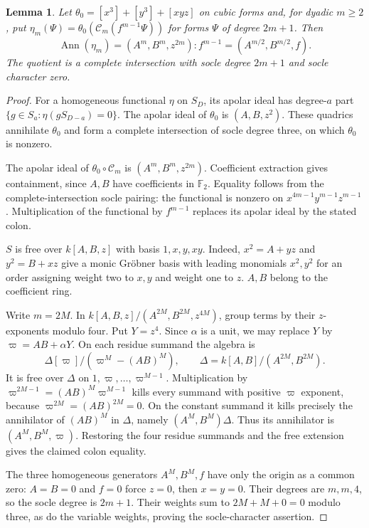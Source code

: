 \documentclass[11pt,a4paper,reqno]{amsart}
\numberwithin{equation}{section}
\theoremstyle{plain}
\newtheorem{lemma}[theorem]{Lemma}
\theoremstyle{definition}
\theoremstyle{remark}
\DeclareMathOperator{\Ann}{Ann}
\begin{document}
\begin{lemma}
Let $\theta_0=[x^3]+[y^3]+[xyz]$ on cubic forms and, for dyadic $m\geq2$, put
$\eta_m(\Psi)=\theta_0(\mathcal C_m(f^{m-1}\Psi))$ for forms $\Psi$ of degree $2m+1$. Then
\[
\Ann(\eta_m)=(A^m,B^m,z^{2m}):f^{m-1}
=(A^{m/2},B^{m/2},f).
\]
The quotient is a complete intersection with socle degree $2m+1$ and socle character zero.
\end{lemma}
\begin{proof}
For a homogeneous functional $\eta$ on $S_D$, its apolar ideal has
degree-$a$ part
$\{g\in S_a:\eta(gS_{D-a})=0\}$.
The apolar ideal of $\theta_0$ is $(A,B,z^2)$.
These quadrics annihilate $\theta_0$ and form a complete intersection
of socle degree three, on which $\theta_0$ is nonzero.

The apolar ideal of $\theta_0\circ\mathcal C_m$ is
$(A^m,B^m,z^{2m})$. Coefficient extraction gives containment, since
$A,B$ have coefficients in $\mathbb F_2$.
Equality follows from the complete-intersection socle pairing:
the functional is nonzero on $x^{4m-1}y^{m-1}z^{m-1}$.
Multiplication of the functional by $f^{m-1}$ replaces its apolar
ideal by the stated colon.

$S$ is free over $k[A,B,z]$ with basis $1,x,y,xy$.
Indeed, $x^2=A+yz$ and $y^2=B+xz$ give a monic Gr\"obner basis
with leading monomials $x^2,y^2$ for an order assigning weight two
to $x,y$ and weight one to $z$. $A,B$ belong to the coefficient ring.

Write $m=2M$. In $k[A,B,z]/(A^{2M},B^{2M},z^{4M})$,
group terms by their $z$-exponents modulo four. Put $Y=z^4$.
Since $\alpha$ is a unit, we may replace $Y$ by
$\varpi=AB+\alpha Y$. On each residue summand the algebra is
\[
\Delta[\varpi]/(\varpi^M-(AB)^M),\qquad \Delta=k[A,B]/(A^{2M},B^{2M}).
\]
It is free over $\Delta$ on $1,\varpi,\ldots,\varpi^{M-1}$. Multiplication by
$\varpi^{2M-1}=(AB)^M\varpi^{M-1}$ kills every summand with positive $\varpi$
exponent, because $\varpi^{2M}=(AB)^{2M}=0$. On the constant summand it kills
precisely the annihilator of $(AB)^M$ in $\Delta$, namely $(A^M,B^M)\Delta$. Thus its
annihilator is $(A^M,B^M,\varpi)$. Restoring the four residue summands and the free
extension gives the claimed colon equality.

The three homogeneous generators $A^M,B^M,f$ have only the origin as a common zero:
$A=B=0$ and $f=0$ force $z=0$, then $x=y=0$. Their degrees are $m,m,4$, so the socle
degree is $2m+1$. Their weights sum to $2M+M+0=0$ modulo three, as do the variable
weights, proving the socle-character assertion.
\end{proof}
\end{document}
